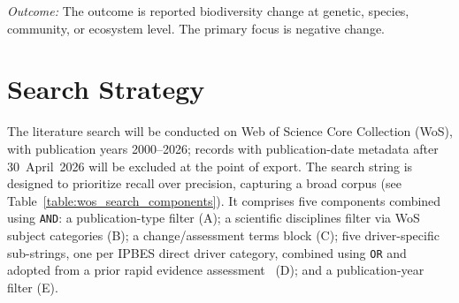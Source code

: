 \documentclass[12pt]{article}
\begin{document}
\emph{Outcome:} The outcome is reported biodiversity change at genetic, species, community, or ecosystem level. The primary focus is negative change.
\section*{Search Strategy}
The literature search will be conducted on Web of Science Core Collection (WoS), with publication years 2000--2026; records with publication-date metadata after 30~April~2026 will be excluded at the point of export. The search string is designed to prioritize recall over precision, capturing a broad corpus (see Table~\ref{table:wos_search_components}). It comprises five components combined using \texttt{AND}: a publication-type filter (A); a scientific disciplines filter via WoS subject categories (B); a change/assessment terms block (C); five driver-specific sub-strings, one per IPBES direct driver category, combined using \texttt{OR} and adopted from a prior rapid evidence assessment~\cite{jaureguiberry_direct_2022} (D); and a publication-year filter (E).
\end{document}
